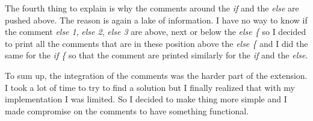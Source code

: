 The fourth thing to explain is why the comments around the \emph{if} and the \emph{else} are pushed above. The reason is again a lake of information. I have no way to know if the comment \emph{else 1}, \emph{else 2}, \emph{else 3} are above, next or below the \emph{else \{ } so I decided to print all the comments that are in these position above the \emph{else \{ } and I did the same for the \emph{if \{ } so that the comment are printed similarly for the \emph{if} and the \emph{else}.

To sum up, the integration of the comments was the harder part of the extension. I took a lot of time to try to find a solution but I finally realized that with my implementation I was limited. So I decided to make thing more simple and I made compromise on the comments to have something functional.